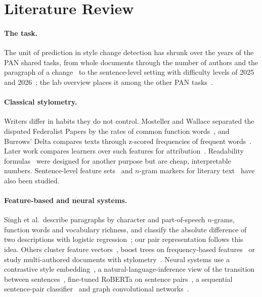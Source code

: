 \documentclass[runningheads]{llncs}
\begin{document}
\section{Literature Review}
\label{sec:related}

\paragraph{The task.} The unit of prediction in style change detection has shrunk over the years of the PAN shared tasks, from whole documents through the number of authors and the paragraph of a change~\cite{zangerle2020overview,bevendorff2021overview} to the sentence-level setting with difficulty levels of 2025 and 2026~\cite{zangerle2025overview,zangerle:2026}; the lab overview places it among the other PAN tasks~\cite{bevendorff:2026b}.

\paragraph{Classical stylometry.} Writers differ in habits they do not control. Mosteller and Wallace separated the disputed Federalist Papers by the rates of common function words~\cite{mosteller1964inference}, and Burrows' Delta compares texts through z-scored frequencies of frequent words~\cite{burrows2002delta}. Later work compares learners over such features for attribution~\cite{10.1093/llc/fqq001}. Readability formulas~\cite{flesch1948new,gunning1952technique,kincaid1975derivation} were designed for another purpose but are cheap, interpretable numbers. Sentence-level feature sets~\cite{oloo2022optimal} and $n$-gram markers for literary text~\cite{rios2022detection} have also been studied.

\paragraph{Feature-based and neural systems.} Singh et al.\ describe paragraphs by character and part-of-speech $n$-grams, function words and vocabulary richness, and classify the absolute difference of two descriptions with logistic regression~\cite{singh2021writing}; our pair representation follows this idea. Others cluster feature vectors~\cite{alshamasi2022ensemble}, boost trees on frequency-based features~\cite{ochab2025styloch} or study multi-authored documents with stylometry~\cite{zamir2024stylometry}. Neural systems use a contrastive style embedding~\cite{chen2023writing}, a natural-language-inference view of the transition between sentences~\cite{kucukkaya2023arc}, fine-tuned RoBERTa on sentence pairs~\cite{rohra2025sentence}, a sequential sentence-pair classifier~\cite{schmidt2025team} and graph convolutional networks~\cite{alsheddi2025team}.
\end{document}
